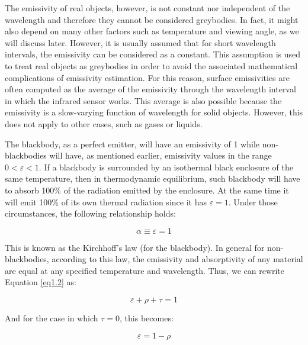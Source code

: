 		\bigskip
		The emissivity of real objects, however, is not constant nor independent of the wavelength and therefore they cannot be considered greybodies. In fact, it might also depend on many other factors such as temperature and viewing angle, as we will discuss later. However, it is usually assumed that for short wavelength intervals, the emissivity can be considered as a constant. This assumption is used to treat real objects as greybodies in order to avoid the associated mathematical complications of emissivity estimation. For this reason, surface emissivities are often computed as the average of the emissivity through the wavelength interval in which the infrared sensor works. This average is also possible because the emissivity is a slow-varying function of wavelength for solid objects. However, this does not apply to other cases, such as gases or liquids.
		
		The blackbody, as a perfect emitter, will have an emissivity of 1 while non-blackbodies will have, as mentioned earlier, emissivity values in the range $0<\varepsilon<1$. If a blackbody is surrounded by an isothermal black enclosure of the same temperature, then in thermodynamic equilibrium, such blackbody will have to absorb 100\% of the radiation emitted by the enclosure. At the same time it will emit 100\% of its own thermal radiation since it has $\varepsilon=1$. Under those circumstances, the following relationship holds:
		
		\begin{equation}\label{eq1.5}
			\alpha \equiv \varepsilon=1
		\end{equation}	
		
		This is known as the Kirchhoff's law (for the blackbody). In general for non-blackbodies, according to this law, the emissivity and absorptivity of any material are equal at any specified temperature and wavelength. Thus, we can rewrite Equation \ref{eq1.2} as:	
		
		\begin{equation}\label{eq1.6}
			\varepsilon + \rho + \tau = 1
		\end{equation}	
		
		And for the case in which $\tau=0$, this becomes:
		
		\begin{equation}\label{eq1.7}
			\varepsilon = 1 - \rho
		\end{equation}	
		
		
			